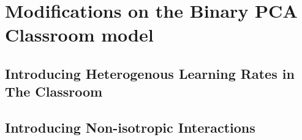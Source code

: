 \chapter{Modifications on the Binary PCA Classroom model}

\section{Introducing Heterogenous Learning Rates in The Classroom}
\section{Introducing Non-isotropic Interactions}
